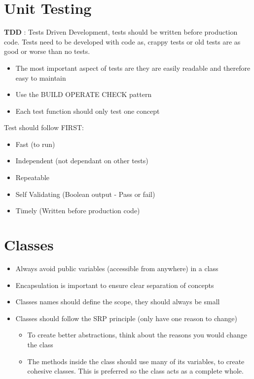 \documentclass[11pt]{scrartcl} %
\begin{document}
\section{Unit Testing}

\textbf{TDD} : Tests Driven Development, tests should be written before production code. 
Tests need to be developed with code as, crappy tests or old tests are as good or worse than no tests.

\begin{itemize}
	\item The most important aspect of tests are they are easily readable and 
	therefore easy to maintain
	\item Use the BUILD OPERATE CHECK pattern
	\item Each test function should only test one concept
\end{itemize}

Test should follow FIRST:
\begin{itemize}
	\item Fast (to run)
	\item Independent (not dependant on other tests)
	\item Repeatable
	\item Self Validating (Boolean output - Pass or fail)
	\item Timely (Written before production code)
\end{itemize}

\section{Classes}

\begin{itemize}
	\item Always avoid public variables (accessible from anywhere) in a class
	\item Encapsulation is important to ensure clear separation of concepts
	\item Classes names should define the scope, they should always be small
	
	\item Classes should follow the SRP principle (only have one reason to change)
	\begin{itemize}
		\item To create better abstractions, think about the reasons you would change the class
		\item The methods inside the class should use many of its variables, to create cohesive classes. This is preferred so the class acts as a complete whole.
	\end{itemize}
\end{itemize}
\end{document}
